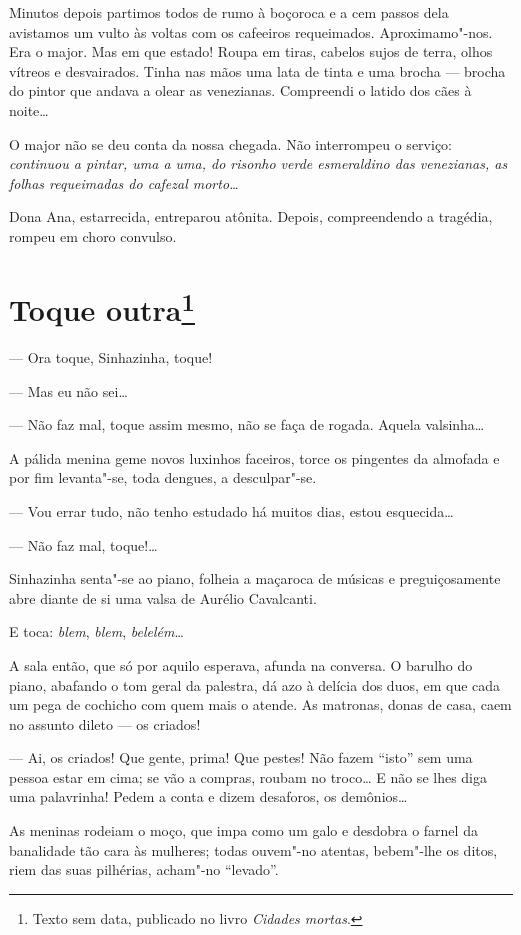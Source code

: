 Minutos depois partimos todos de rumo à boçoroca e a cem passos dela
avistamos um vulto às voltas com os cafeeiros requeimados.
Aproximamo"-nos. Era o major. Mas em que estado! Roupa em tiras, cabelos
sujos de terra, olhos vítreos e desvairados. Tinha nas mãos uma lata de
tinta e uma brocha --- brocha do pintor que andava a olear as
venezianas. Compreendi o latido dos cães à noite\ldots{}

O major não se deu conta da nossa chegada. Não interrompeu o serviço:
\emph{continuou a pintar, uma a uma, do risonho verde esmeraldino das
venezianas, as folhas requeimadas do cafezal morto\ldots{}}

Dona Ana, estarrecida, entreparou atônita. Depois, compreendendo a
tragédia, rompeu em choro convulso.

\chapter{Toque outra\footnote[*]{Texto sem data, publicado no livro \emph{Cidades mortas}.}}

--- Ora toque, Sinhazinha, toque!

--- Mas eu não sei\ldots{}

--- Não faz mal, toque assim mesmo, não se faça de rogada. Aquela
valsinha\ldots{}

A pálida menina geme novos luxinhos faceiros, torce os pingentes da
almofada e por fim levanta"-se, toda dengues, a desculpar"-se.

--- Vou errar tudo, não tenho estudado há muitos dias, estou
esquecida\ldots{}

--- Não faz mal, toque!\ldots{}

Sinhazinha senta"-se ao piano, folheia a maçaroca de músicas e
preguiçosamente abre diante de si uma valsa de Aurélio Cavalcanti.

E toca: \emph{blem}, \emph{blem}, \emph{belelém}\ldots{}

A sala então, que só por aquilo esperava, afunda na conversa. O barulho
do piano, abafando o tom geral da palestra, dá azo à delícia dos duos,
em que cada um pega de cochicho com quem mais o atende. As matronas,
donas de casa, caem no assunto dileto --- os criados!

--- Ai, os criados! Que gente, prima! Que pestes! Não fazem ``isto'' sem
uma pessoa estar em cima; se vão a compras, roubam no troco\ldots{} E não se
lhes diga uma palavrinha! Pedem a conta e dizem desaforos, os
demônios\ldots{}

As meninas rodeiam o moço, que impa como um galo e desdobra o farnel da
banalidade tão cara às mulheres; todas ouvem"-no atentas, bebem"-lhe os
ditos, riem das suas pilhérias, acham"-no ``levado''.

